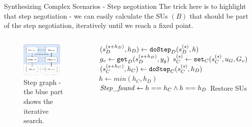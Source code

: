 \documentclass{beamer}
\begin{document}
\begin{frame}{Synthesizing Complex Scenarios - Step negotiation}
    The trick here is to highlight that step negotiation - we can easily calculate the SUs $(B)$ that should be part of the step negotiation, iteratively until we reach a fixed point.
    \begin{columns}[T] 
        \begin{column}{.48\textwidth}
            \begin{figure}    
                \includegraphics[width=0.8\textwidth]{images/step_scenario_graph.pdf}
                \caption{Step graph - the blue part shows the iterative search.}
            \end{figure}  
        \end{column}
    \hfill%
    \begin{column}{.48\textwidth}
        \begin{algorithm}[H]
            \caption{Step negotiation.}
        \begin{algorithmic}[1]
          \scriptsize
            \While{$!\stepfound$} 
            \State $(s_{D}^{(s+h_D)},h_D) \gets \mathtt{doStep}_{D}(s_{D}^{(s)}, h)$
            \State $g_v \gets \mathtt{get}_{D}(s_{D}^{(s+h_D)}, y_{g})$       
            \State $s_{C}^{(s)} \gets \mathtt{set}_{C}(s_{C}^{(s)}, u_{G}, G_v)$
            \State $(s_{C}^{(s+h_C)},h_C) \gets \mathtt{doStep}_{C}(s_{C}^{(s)}, h_D)$
            \State $h \gets min(h_C, h_D)$
            \State $\mathit{Step\_found} \gets h == h_C \land h == h_D$
            \If{$!\stepfound$}
                \State Restore SUs
            \EndIf
            \EndWhile
        \end{algorithmic} 
      \end{algorithm}
    \end{column}
    \end{columns}
\end{frame}
\end{document}

